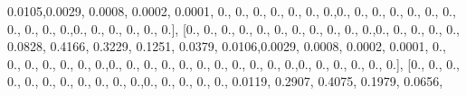 \documentclass[
]{book}
\newenvironment{Shaded}{\begin{snugshade}}{\end{snugshade}}
\newcommand{\FloatTok}[1]{\textcolor[rgb]{0.00,0.00,0.81}{#1}}
\newcommand{\NormalTok}[1]{#1}
\begin{document}
\begin{Shaded}
\begin{Highlighting}[]
\FloatTok{0.0105}\NormalTok{,}\FloatTok{0.0029}\NormalTok{, }\FloatTok{0.0008}\NormalTok{, }\FloatTok{0.0002}\NormalTok{, }\FloatTok{0.0001}\NormalTok{, }\FloatTok{0.}\NormalTok{, }\FloatTok{0.}\NormalTok{, }\FloatTok{0.}\NormalTok{, }\FloatTok{0.}\NormalTok{, }\FloatTok{0.}\NormalTok{, }\FloatTok{0.}\NormalTok{, }\FloatTok{0.}\NormalTok{,}\FloatTok{0.}\NormalTok{, }\FloatTok{0.}\NormalTok{, }\FloatTok{0.}\NormalTok{,}
\FloatTok{0.}\NormalTok{, }\FloatTok{0.}\NormalTok{, }\FloatTok{0.}\NormalTok{, }\FloatTok{0.}\NormalTok{, }\FloatTok{0.}\NormalTok{, }\FloatTok{0.}\NormalTok{, }\FloatTok{0.}\NormalTok{, }\FloatTok{0.}\NormalTok{,}\FloatTok{0.}\NormalTok{, }\FloatTok{0.}\NormalTok{, }\FloatTok{0.}\NormalTok{, }\FloatTok{0.}\NormalTok{, }\FloatTok{0.}\NormalTok{, }\FloatTok{0.}\NormalTok{], [}\FloatTok{0.}\NormalTok{, }\FloatTok{0.}\NormalTok{, }\FloatTok{0.}\NormalTok{, }\FloatTok{0.}\NormalTok{, }\FloatTok{0.}\NormalTok{, }\FloatTok{0.}\NormalTok{,}
\FloatTok{0.}\NormalTok{, }\FloatTok{0.}\NormalTok{, }\FloatTok{0.}\NormalTok{, }\FloatTok{0.}\NormalTok{, }\FloatTok{0.}\NormalTok{,}\FloatTok{0.}\NormalTok{, }\FloatTok{0.}\NormalTok{, }\FloatTok{0.}\NormalTok{, }\FloatTok{0.}\NormalTok{, }\FloatTok{0.}\NormalTok{, }\FloatTok{0.0828}\NormalTok{, }\FloatTok{0.4166}\NormalTok{, }\FloatTok{0.3229}\NormalTok{, }\FloatTok{0.1251}\NormalTok{, }\FloatTok{0.0379}\NormalTok{,}
\FloatTok{0.0106}\NormalTok{,}\FloatTok{0.0029}\NormalTok{, }\FloatTok{0.0008}\NormalTok{, }\FloatTok{0.0002}\NormalTok{, }\FloatTok{0.0001}\NormalTok{, }\FloatTok{0.}\NormalTok{, }\FloatTok{0.}\NormalTok{, }\FloatTok{0.}\NormalTok{, }\FloatTok{0.}\NormalTok{, }\FloatTok{0.}\NormalTok{, }\FloatTok{0.}\NormalTok{, }\FloatTok{0.}\NormalTok{,}\FloatTok{0.}\NormalTok{, }\FloatTok{0.}\NormalTok{, }\FloatTok{0.}\NormalTok{,}
\FloatTok{0.}\NormalTok{, }\FloatTok{0.}\NormalTok{, }\FloatTok{0.}\NormalTok{, }\FloatTok{0.}\NormalTok{, }\FloatTok{0.}\NormalTok{, }\FloatTok{0.}\NormalTok{, }\FloatTok{0.}\NormalTok{, }\FloatTok{0.}\NormalTok{,}\FloatTok{0.}\NormalTok{, }\FloatTok{0.}\NormalTok{, }\FloatTok{0.}\NormalTok{, }\FloatTok{0.}\NormalTok{, }\FloatTok{0.}\NormalTok{, }\FloatTok{0.}\NormalTok{], [}\FloatTok{0.}\NormalTok{, }\FloatTok{0.}\NormalTok{, }\FloatTok{0.}\NormalTok{, }\FloatTok{0.}\NormalTok{, }\FloatTok{0.}\NormalTok{, }\FloatTok{0.}\NormalTok{,}
\FloatTok{0.}\NormalTok{, }\FloatTok{0.}\NormalTok{, }\FloatTok{0.}\NormalTok{, }\FloatTok{0.}\NormalTok{, }\FloatTok{0.}\NormalTok{,}\FloatTok{0.}\NormalTok{, }\FloatTok{0.}\NormalTok{, }\FloatTok{0.}\NormalTok{, }\FloatTok{0.}\NormalTok{, }\FloatTok{0.}\NormalTok{, }\FloatTok{0.0119}\NormalTok{, }\FloatTok{0.2907}\NormalTok{, }\FloatTok{0.4075}\NormalTok{, }\FloatTok{0.1979}\NormalTok{, }\FloatTok{0.0656}\NormalTok{,}

\end{Highlighting}
\end{Shaded}
\end{document}
